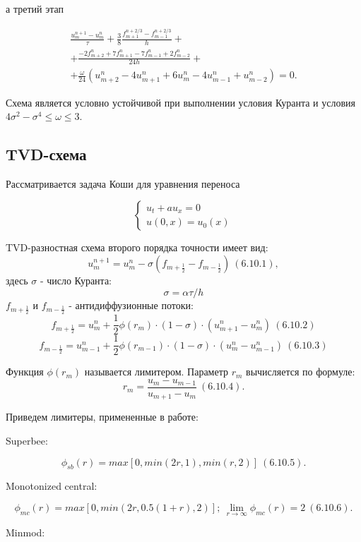 \documentclass{article}
\begin{document}
а третий этап

\begin{equation}
\begin{gathered}
\frac{u^{n+1}_{m}-u^n_m}{\tau} + \frac{3}{8}\frac{f^{n+2/3}_{m+1}-f^{n+2/3}_{m-1}}{h}+ \\ + \frac{-2f^n_{m+2} + 7f^n_{m+1} -7f^n_{m-1} + 2f^n_{m-2}}{24h} + \\ + \frac{\omega}{24}(u^n_{m+2} - 4u^n_{m+1} + 6u^n_m - 4u^n_{m-1} + u^n_{m-2}) = 0.
\end{gathered}
\end{equation}

Схема является условно устойчивой при выполнении условия Куранта и условия $4\sigma^2 - \sigma^4 \leq \omega \leq 3.$


\subsection{TVD-схема}

Рассматривается задача Коши для уравнения переноса

$$ \left\{
        \begin{array}{l}
             u_t + au_x = 0\\
             u(0,x) = u_0(x)
        \end{array}
    \right. $$
    
TVD-разностная схема второго порядка точности имеет вид:
$$ u_m^{n+1} = u_m^n - \sigma(f_{m+\frac{1}{2}} - f_{m-\frac{1}{2}}) \: (6.10.1),$$
здесь $\sigma$ - число Куранта:
$$ \sigma = \alpha\tau/h $$
$f_{m+\frac{1}{2}}$ и $f_{m-\frac{1}{2}}$ - антидиффузионные потоки:
$$ f_{m+\frac{1}{2}} = u_m^n + \frac{1}{2} \phi( r_m ) \cdot ( 1 - \sigma ) \cdot ( u_{m+1}^n - u_m^n ) \: (6.10.2)$$
$$ f_{m-\frac{1}{2}} = u_{m-1}^n + \frac{1}{2} \phi( r_{m-1} ) \cdot ( 1 - \sigma ) \cdot ( u_m^n - u_{m-1}^n ) \: (6.10.3)$$

Функция $\phi(r_m)$ называется лимитером. Параметр $r_m$ вычисляется по формуле:
$$ r_m = \frac{u_m - u_{m-1}}{u_{m+1} - u_m} \: (6.10.4).$$

Приведем лимитеры, примененные в работе:

Superbee:

$$\phi_{sb}(r) = max[0, min(2r,1),min(r,2)] \: (6.10.5).$$

Monotonized central:

$$\phi_{mc}(r) = max[0, min(2r,0.5(1+r),2)]; \: \lim\limits_{r\to \infty}\phi_{mc}(r) = 2 \: (6.10.6). $$

Minmod:
\end{document}
